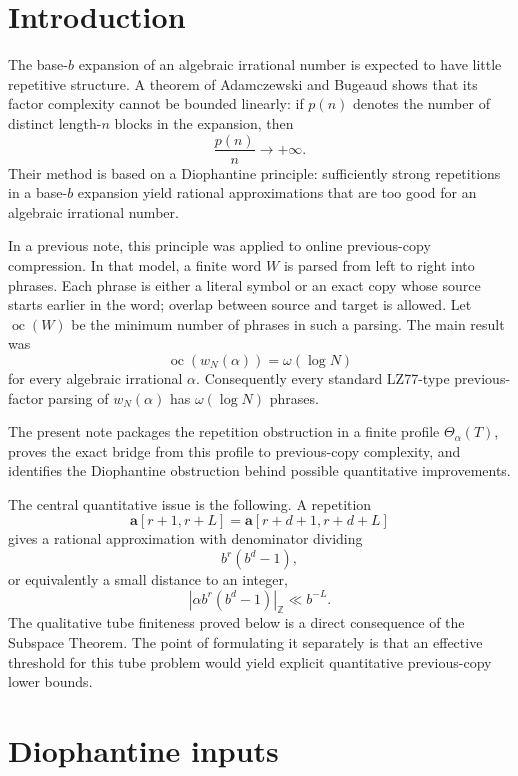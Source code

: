 \documentclass[11pt]{amsart}
\DeclareMathOperator{\oc}{oc}
\newcommand{\normZ}[1]{\left|#1\right|_{\mathbb Z}}
\begin{document}
\maketitle

\section{Introduction}

The base-\(b\) expansion of an algebraic irrational number is expected to have little repetitive structure. A theorem of Adamczewski and Bugeaud shows that its factor complexity cannot be bounded linearly: if \(p(n)\) denotes the number of distinct length-\(n\) blocks in the expansion, then
\[
\frac{p(n)}{n}\to+\infty.
\]
Their method is based on a Diophantine principle: sufficiently strong repetitions in a base-\(b\) expansion yield rational approximations that are too good for an algebraic irrational number.

In a previous note, this principle was applied to online previous-copy compression. In that model, a finite word \(W\) is parsed from left to right into phrases. Each phrase is either a literal symbol or an exact copy whose source starts earlier in the word; overlap between source and target is allowed. Let \(\oc(W)\) be the minimum number of phrases in such a parsing. The main result was
\[
\oc(w_N(\alpha))=\omega(\log N)
\]
for every algebraic irrational \(\alpha\). Consequently every standard LZ77-type previous-factor parsing of \(w_N(\alpha)\) has \(\omega(\log N)\) phrases.

The present note packages the repetition obstruction in a finite profile \(\Theta_\alpha(T)\), proves the exact bridge from this profile to previous-copy complexity, and identifies the Diophantine obstruction behind possible quantitative improvements.

The central quantitative issue is the following. A repetition
\[
\mathbf a[r+1,r+L]=\mathbf a[r+d+1,r+d+L]
\]
gives a rational approximation with denominator dividing
\[
b^r(b^d-1),
\]
or equivalently a small distance to an integer,
\[
\normZ{\alpha b^r(b^d-1)}\ll b^{-L}.
\]
The qualitative tube finiteness proved below is a direct consequence of the Subspace Theorem. The point of formulating it separately is that an effective threshold for this tube problem would yield explicit quantitative previous-copy lower bounds.

\section{Diophantine inputs}
\end{document}
